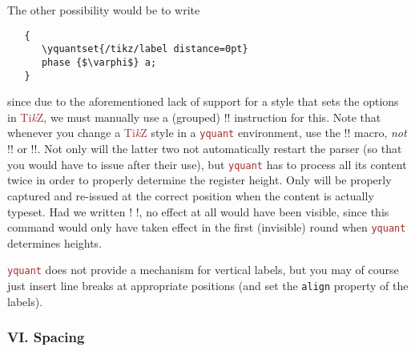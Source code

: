 \documentclass{scrartcl}
\def\TikZ{\textcolor{brown}{Ti\textit kZ}}
\def\pkg#1{\textcolor{brown}{\texttt{#1}}}
\def\texlink{\link\tex}
\def\Yquant{\pkg{yquant}}
\begin{document}
\begin{example}
               The other possibility would be to write
               \begin{verbatim}
   {
      \yquantset{/tikz/label distance=0pt}
      phase {$\varphi$} a;
   }
               \end{verbatim}
               since due to the aforementioned lack of support for a style that sets the options in \TikZ, we must manually use a (grouped) \tex!\yquantset! instruction for this.
               Note that whenever you change a \TikZ{} style in a \Yquant{} environment, use the \tex!\yquantset! macro, \emph{not} \tex!\tikzset! or \tex!\pgfkeys!.
               Not only will the latter two not automatically restart the parser (so that you would have to issue \texlink{\yquant} after their use), but \Yquant{} has to process all its content twice in order to properly determine the register height.
               Only \texlink{\yquantset} will be properly captured and re\hyp issued at the correct position when the content is actually typeset.
               Had we written \tex!\tikzset{label distance=0pt} \yquant!, no effect at all would have been visible, since this command would only have taken effect in the first (invisible) round when \Yquant{} determines heights.
            \end{example}

            \Yquant{} does not provide a mechanism for vertical labels, but you may of course just insert line breaks at appropriate positions (and set the \texttt{align} property of the labels).

         \subsubsection{VI. Spacing}
\end{document}

